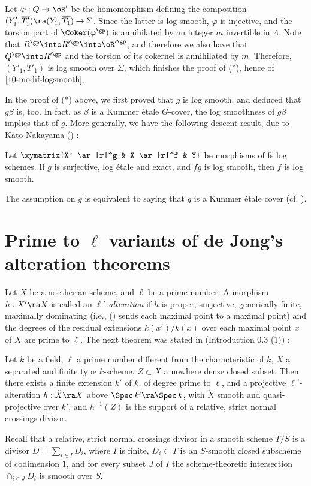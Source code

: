 \documentclass[10pt]{../fichiers-configuration-latex/smfart}
\begin{document}
Let $\varphi:Q\to\oR'$ be the homomorphism defining the composition
$(Y'_1,\overline{T'_1}) \ra (Y_1,\overline{T_1})\to\Sigma$. Since the
latter is log smooth, $\varphi$ is injective, and the torsion part
of $\Coker(\varphi^\gp)$ is annihilated by an integer $m$ invertible
in $\Lambda$.  Note that $R^\gp\into R'^\gp\into\oR'^\gp$, and therefore
we also have that $Q^\gp\into R'^\gp$ and the torsion of its cokernel is
annihilated by $m$. Therefore, $(Y'_1,T'_1)$ is log smooth over $\Sigma$,
which finishes the proof of (*), hence of $\ref{10-modif-logsmooth}$.

\begin{remark}\label{10-remark proof of (*)} In the proof of (*) above, we
first proved that $g$ is log smooth, and deduced that $g\beta$ is, too. In
fact, as $\beta$ is a Kummer étale $G$-cover, the log smoothness of $g\beta$
implies that of $g$. More generally, we have the following descent result,
due to Kato-Nakayama (\cite[3.4]{quasisections@Nakayama}) :
\end{remark}

\begin{theorem} Let $\xymatrix{X' \ar[r]^g & X \ar[r]^f & Y}$ be morphisms
of fs log schemes. If $g$ is surjective, log étale and exact,  and $fg$
is log smooth, then $f$ is log smooth.
\end{theorem} The assumption
on $g$ is equivalent to saying that $g$ is a Kummer étale cover
(cf. \cite[1.6]{Overview@Illusie}).

\section{Prime to $\ell$ variants of de Jong's alteration theorems}\label{10-primesec}

Let $X$ be a noetherian scheme, and $\ell$  be a prime number. A morphism
$h : X' \ra X$ is called an \textit{$\ell'$-alteration} if $h$ is proper,
surjective, generically finite, maximally dominating (i.e., ()
sends each maximal point to a maximal point) and the degrees of
the residual extensions $k(x')/k(x)$ over each maximal point $x$ of $X$
are prime to $\ell$. The next theorem was stated in (Introduction 0.3 (1)) :

\begin{theorem}[Gabber]\label{10-de Jong1} Let $k$ be a field, $\ell$ a
prime number different from the characteristic of $k$, $X$ a separated and
finite type $k$-scheme, $Z \subset X$ a nowhere dense closed subset. Then
there exists a finite extension $k'$ of $k$, of degree prime to $\ell$,
and a projective $\ell'$-alteration $h : \tilde X \ra X$ above $\Spec \,
k' \ra \Spec \, k$, with $\tilde X$ smooth and quasi-projective over $k'$,
and $h^{-1}(Z)$ is the support of a relative, strict normal crossings divisor.
\end{theorem} Recall that a relative, strict normal crossings divisor in
a smooth scheme $T/S$ is a divisor $D = \sum_{i \in I}D_i$, where $I$ is
finite, $D_i \subset T$ is an $S$-smooth closed subscheme of codimension 1,
and for every subset $J$ of $I$ the scheme-theoretic intersection $\cap_{i
\in J}D_i$ is smooth over $S$.
\end{document}
